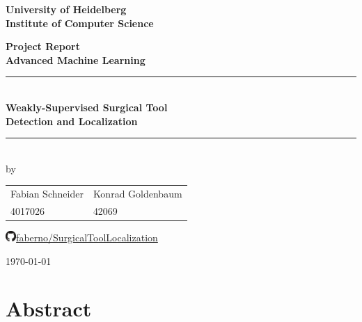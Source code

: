 \documentclass[
     12pt,         %
     a4paper,      %
     DIV=14,        %
     ]{scrreprt}
\date{\today}
\begin{document}
\begin{titlepage}


\vspace*{1cm}
\begin{center}
\vspace*{3cm}
\textbf{ 
\Large University of Heidelberg\\
\smallskip
\Large Institute of Computer Science\\
\smallskip
}

\vspace{2cm}

\textbf{\Large Project Report\\[0.4 cm]	 \large Advanced Machine Learning} %

\vspace{1.5\baselineskip}
\rule{\linewidth}{0.2 mm} \\[0.4 cm]
{\huge
\textbf{Weakly-Supervised Surgical Tool}\\
\bigskip
\textbf{Detection and Localization}
}\\
\bigskip
\rule{\linewidth}{0.2 mm} \\[1.0 cm]

by\\[0.5cm]


\begin{table}[h]
	\large
	\centering
	\begin{tabular}{P{5.5cm}P{5cm}}
		Fabian Schneider & Konrad Goldenbaum \\ 
		4017026 & 42069 \\
	\end{tabular}
\end{table}

\vspace{0.5cm}
\includegraphics[width=0.4cm]{github}\hspace{0.15cm}\href{https://github.com/faberno/SurgicalToolLocalization}{faberno/SurgicalToolLocalization}
\vfill

\today


\end{center}

\end{titlepage}

\chapter*{Abstract}

\end{document}

